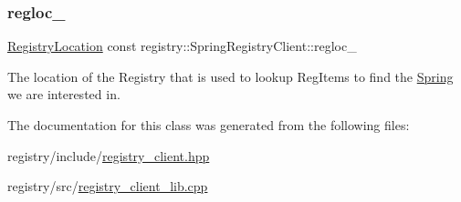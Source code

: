 \subsubsection{\texorpdfstring{regloc\+\_\+}{regloc\_}}
{\footnotesize\ttfamily \hyperlink{structregistry_1_1RegistryLocation}{Registry\+Location} const registry\+::\+Spring\+Registry\+Client\+::regloc\+\_\+\hspace{0.3cm}{\ttfamily [private]}}

The location of the Registry that is used to lookup Reg\+Items to find the \hyperlink{classSpring}{Spring} we are interested in. 

The documentation for this class was generated from the following files\+:\begin{DoxyCompactItemize}
\item 
registry/include/\hyperlink{registry__client_8hpp}{registry\+\_\+client.\+hpp}\item 
registry/src/\hyperlink{registry__client__lib_8cpp}{registry\+\_\+client\+\_\+lib.\+cpp}\end{DoxyCompactItemize}
